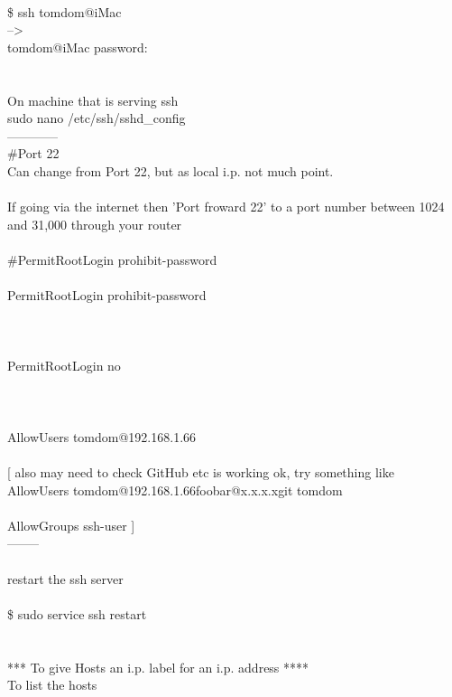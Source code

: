 \documentclass[10pt,a4paper]{article}
\begin{document}
{{{{{{{{{{{{{{{{{{{{{{\\
\$ ssh tomdom@iMac\\
-->\\
tomdom@iMac password:  \\
\\
\\
On machine that is serving ssh\\
sudo nano /etc/ssh/sshd\_config}{\large \\
------------\\
\#Port 22\\
Can change from Port 22, but as local i.p. not much point.\\
\\
If going via the internet then 'Port froward 22' to a port number between 1024 and 31,000 through your router\\
\\
\#PermitRootLogin prohibit-password\\
[ change to]\\
PermitRootLogin prohibit-password \\
[ this means only public-key, hostbased and GSSAPI authentication allowed ]\\
\\
[ OR] \\
PermitRootLogin no      \\
[wont disable on Ubuntu though as it doesn't have root by default !! ]\\
\\
[at the bottom of sshd\_config set specific user and i.p. address only allowed ssh access]\\
AllowUsers tomdom@192.168.1.66}{\large \\
\\
[ also may need to check GitHub etc is working ok, try something like\\
AllowUsers tomdom@192.168.1.66}{\large foobar@x.x.x.x}{\large  git tomdom\\
\\
AllowGroups ssh-user ]\\
--------\\
\\
restart the ssh server\\
\\
\$ sudo service ssh restart\\
\\
\\
*** To give Hosts an i.p. label for an i.p. address  ****\\
To list the hosts\\
}}}}}}}}}}}}}}}}}}}}}}
\end{document}
